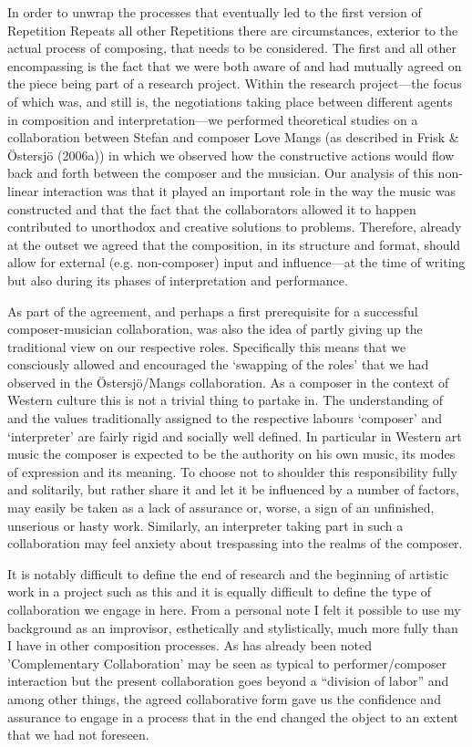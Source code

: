 In order to unwrap the processes that eventually led to the first
version of Repetition Repeats all other Repetitions there are
circumstances, exterior to the actual process of composing, that needs
to be considered. The first and all other encompassing is the fact
that we were both aware of and had mutually agreed on the piece being
part of a research project. Within the research project---the focus of
which was, and still is, the negotiations taking place between
different agents in composition and interpretation---we performed
theoretical studies on a collaboration between Stefan and composer
Love Mangs (as described in Frisk \& \"{O}stersj\"{o} (2006a)) in
which we observed how the constructive actions would flow back and
forth between the composer and the musician. Our analysis of this
non-linear interaction was that it played an important role in the way
the music was constructed and that the fact that the collaborators
allowed it to happen contributed to unorthodox and creative solutions
to problems. Therefore, already at the outset we agreed that the
composition, in its structure and format, should allow for external
(e.g. non-composer) input and influence---at the time of writing but
also during its phases of interpretation and performance.

As part of the agreement, and perhaps a first prerequisite for a
successful composer-musician collaboration, was also the idea of
partly giving up the traditional view on our respective
roles. Specifically this means that we consciously allowed and
encouraged the `swapping of the roles' that we had observed in the
\"{O}stersj\"{o}/Mangs collaboration. As a composer in the context of
Western culture this is not a trivial thing to partake in. The
understanding of and the values traditionally assigned to the
respective labours `composer' and `interpreter' are fairly rigid and
socially well defined. In particular in Western art music the composer
is expected to be the authority on his own music, its modes of
expression and its meaning. To choose not to shoulder this
responsibility fully and solitarily, but rather share it and let it be
influenced by a number of factors, may easily be taken as a lack of
assurance or, worse, a sign of an unfinished, unserious or hasty
work. Similarly, an interpreter taking part in such a collaboration
may feel anxiety about trespassing into the realms of the composer.

It is notably difficult to define the end of research and the
beginning of artistic work in a project such as this and it is equally
difficult to define the type of collaboration we engage in here. From
a personal note I felt it possible to use my background as an
improvisor, esthetically and stylistically, much more fully than I
have in other composition processes. As has already been noted
'Complementary Collaboration' may be seen as typical to
performer/composer interaction but the present collaboration goes
beyond a ``division of labor'' and among other things, the agreed
collaborative form gave us the confidence and assurance to engage in a
process that in the end changed the object to an extent that we had
not foreseen.

